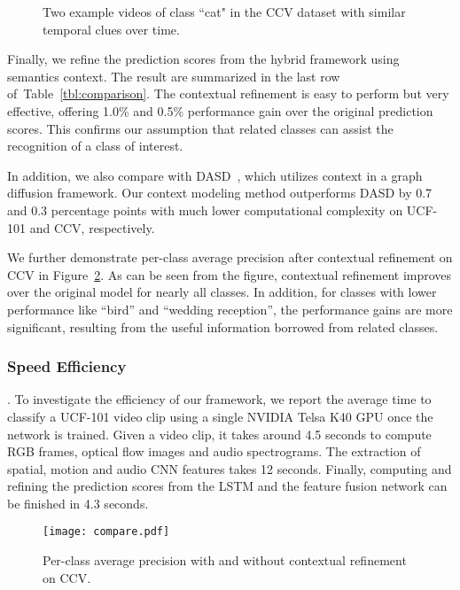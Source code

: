 \documentclass[journal]{IEEEtran}
\begin{document}


\begin{figure}[t!]
\centering
{}
\caption{Two example videos of class ``cat" in the CCV dataset with similar temporal clues over time.}
\label{fig:example}
\end{figure}

Finally, we refine the prediction scores from the hybrid framework using semantics context. The result are summarized in the last row of~Table~\ref{tbl:comparison}. The contextual refinement is easy to perform but very effective, offering 1.0\% and 0.5\% performance gain over the original prediction scores. This confirms our assumption that related classes can assist the recognition of a class of interest.  {\color{black}In addition, we also compare with DASD~\cite{iccv09:dasd}, which utilizes context in a graph diffusion framework. Our context modeling method outperforms DASD by 0.7 and 0.3 percentage points with much lower computational complexity on UCF-101 and CCV, respectively. 

We further demonstrate per-class average precision after contextual refinement on CCV in Figure~\ref{fig:perclassCCV}. As can be seen from the figure, contextual refinement improves over the original model for nearly all classes. In addition, for classes with lower performance like ``bird'' and ``wedding reception'', the performance gains are more significant, resulting from the useful information borrowed from related classes.}


\subsubsection{Speed Efficiency}. To investigate the efficiency of our framework, we report the average time to classify a UCF-101 video clip using a single NVIDIA Telsa K40 GPU once the network is trained. Given a video clip, it takes around 4.5 seconds to compute RGB frames, optical flow images and audio spectrograms. The extraction of spatial, motion and audio CNN features takes 12 seconds. Finally, computing and refining the prediction scores from the LSTM and the feature fusion network can be finished in 4.3 seconds.
\begin{figure}[t!]
\centering
\texttt{[image: compare.pdf]}
\caption{Per-class average precision with and without contextual refinement on CCV. }
\label{fig:perclassCCV}
\end{figure}
\end{document}
